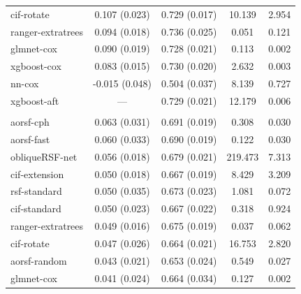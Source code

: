 \documentclass[12pt]{article}\usepackage[]{graphicx}\usepackage[]{xcolor}
\newenvironment{knitrout}{}{} %
\begin{document}
\begin{knitrout}
\begin{longtable}[t]{lcccc}
\hspace{1em}cif-rotate & 0.107 (0.023) & 0.729 (0.017) & 10.139 & 2.954\\
\hspace{1em}ranger-extratrees & 0.094 (0.018) & 0.736 (0.025) & 0.051 & 0.121\\
\hspace{1em}glmnet-cox & 0.090 (0.019) & 0.728 (0.021) & 0.113 & 0.002\\
\hspace{1em}xgboost-cox & 0.083 (0.015) & 0.730 (0.020) & 2.632 & 0.003\\
\hspace{1em}nn-cox & -0.015 (0.048) & 0.504 (0.037) & 8.139 & 0.727\\
\hspace{1em}xgboost-aft & --- & 0.729 (0.021) & 12.179 & 0.006\\
\addlinespace[0.3em]
\multicolumn{5}{l}{\textit{\textbf{Lung cancer; death, n = 442, p = 24}}}\\
\hline
\hspace{1em}aorsf-cph & 0.063 (0.031) & 0.691 (0.019) & 0.308 & 0.030\\
\hspace{1em}aorsf-fast & 0.060 (0.033) & 0.690 (0.019) & 0.122 & 0.030\\
\hspace{1em}obliqueRSF-net & 0.056 (0.018) & 0.679 (0.021) & 219.473 & 7.313\\
\hspace{1em}cif-extension & 0.050 (0.018) & 0.667 (0.019) & 8.429 & 3.209\\
\hspace{1em}rsf-standard & 0.050 (0.035) & 0.673 (0.023) & 1.081 & 0.072\\
\hspace{1em}cif-standard & 0.050 (0.023) & 0.667 (0.022) & 0.318 & 0.924\\
\hspace{1em}ranger-extratrees & 0.049 (0.016) & 0.675 (0.019) & 0.037 & 0.062\\
\hspace{1em}cif-rotate & 0.047 (0.026) & 0.664 (0.021) & 16.753 & 2.820\\
\hspace{1em}aorsf-random & 0.043 (0.021) & 0.653 (0.024) & 0.549 & 0.027\\
\hspace{1em}glmnet-cox & 0.041 (0.024) & 0.664 (0.034) & 0.127 & 0.002\\

\end{longtable}
\end{knitrout}
\end{document}
